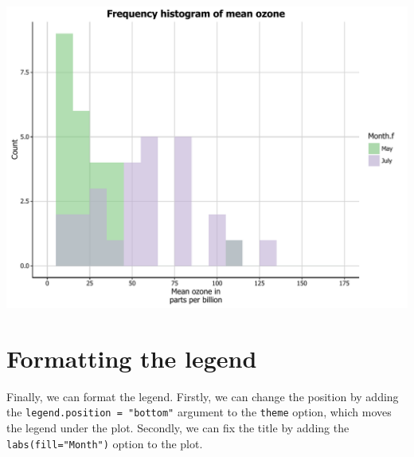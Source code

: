 \begin{center}\includegraphics[width=0.55\linewidth]{figures/histogram_19-1} \end{center}

\section{Formatting the legend}\label{formatting-the-legend}

Finally, we can format the legend. Firstly, we can change the position
by adding the \texttt{legend.position\ =\ "bottom"} argument to the
\texttt{theme} option, which moves the legend under the plot. Secondly,
we can fix the title by adding the \texttt{labs(fill="Month")} option to
the plot.

